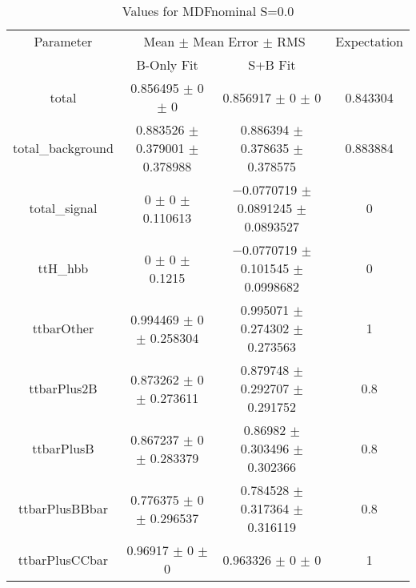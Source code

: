 \begin{table}
\centering
\caption{Values for MDFnominal S=0.0}
\begin{tabular}{cccc}
\toprule
Parameter & \multicolumn{2}{c}{Mean $\pm$ Mean Error $\pm$ RMS} & Expectation\\
 & B-Only Fit & S+B Fit & \\
\midrule
total & \num{0.856495} $\pm$ \num{0} $\pm$ \num{0} & \num{0.856917} $\pm$ \num{0} $\pm$ \num{0} & \num{0.843304}\\
total\_background & \num{0.883526} $\pm$ \num{0.379001} $\pm$ \num{0.378988} & \num{0.886394} $\pm$ \num{0.378635} $\pm$ \num{0.378575} & \num{0.883884}\\
total\_signal & \num{0} $\pm$ \num{0} $\pm$ \num{0.110613} & \num{-0.0770719} $\pm$ \num{0.0891245} $\pm$ \num{0.0893527} & \num{0}\\
ttH\_hbb & \num{0} $\pm$ \num{0} $\pm$ \num{0.1215} & \num{-0.0770719} $\pm$ \num{0.101545} $\pm$ \num{0.0998682} & \num{0}\\
ttbarOther & \num{0.994469} $\pm$ \num{0} $\pm$ \num{0.258304} & \num{0.995071} $\pm$ \num{0.274302} $\pm$ \num{0.273563} & \num{1}\\
ttbarPlus2B & \num{0.873262} $\pm$ \num{0} $\pm$ \num{0.273611} & \num{0.879748} $\pm$ \num{0.292707} $\pm$ \num{0.291752} & \num{0.8}\\
ttbarPlusB & \num{0.867237} $\pm$ \num{0} $\pm$ \num{0.283379} & \num{0.86982} $\pm$ \num{0.303496} $\pm$ \num{0.302366} & \num{0.8}\\
ttbarPlusBBbar & \num{0.776375} $\pm$ \num{0} $\pm$ \num{0.296537} & \num{0.784528} $\pm$ \num{0.317364} $\pm$ \num{0.316119} & \num{0.8}\\
ttbarPlusCCbar & \num{0.96917} $\pm$ \num{0} $\pm$ \num{0} & \num{0.963326} $\pm$ \num{0} $\pm$ \num{0} & \num{1}\\
\bottomrule
\end{tabular}
\end{table}